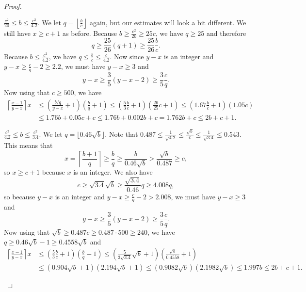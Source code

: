 \documentclass[10pt,a4paper]{amsart}
\begin{document}
\begin{proof}
\begin{case} $\frac{c^2}{20}\leq b\leq\frac{c^2}{4.2}$. We let $q=\left\lfloor\frac bc\right\rfloor$ again, but our estimates will look a bit different. We still have $x\geq c+1$ as before. Because $b\geq\frac{c^2}{20}\geq 25c$, we have $q\geq 25$ and therefore
\begin{equation*}
q\geq \frac {25}{26}(q+1)\geq\frac{25}{26}\frac bc.
\end{equation*}
Because $b\leq\frac{c^2}{4.2}$, we have $q\leq\frac bc\leq\frac c{4.2}$. Now since $y-x$ is an integer and $y-x\geq\frac cq-2\geq 2.2$, we must have $y-x\geq 3$ and
\begin{equation*}
y-x\geq\frac 35(y-x+2)\geq \frac 35\frac cq.
\end{equation*}
Now using that $c\geq 500$, we have
\begin{align*}
\left\lceil\frac{x-1}{y-x}\right\rceil x&\leq\left(\frac{b/q}{y-x}+1\right)\left(\frac bq+1\right)\leq\left(\frac 53\frac bc+1\right)\left(\frac{26}{25}c+1\right)\leq(1.67\frac bc+1)(1.05c)\\&\leq 1.76b+0.05c+c\leq 1.76b+0.002b+c=1.762b+c\leq 2b+c+1.
\end{align*}
\end{case}

\begin{case}$\frac{c^2}{4.2}\leq b\leq\frac{c^2}{3.4}$. We let $q=\lfloor 0.46\sqrt b\rfloor$. Note that $0.487\leq \frac 1{\sqrt{4.2}}\leq\frac{\sqrt b}c\leq\frac 1{\sqrt{3.4}}\leq 0.543$. This means that
\begin{equation*}
x=\left\lceil\frac{b+1}q\right\rceil\geq\frac bq\geq \frac b{0.46\sqrt b}>\frac{\sqrt b}{0.487}\geq c,
\end{equation*}
so $x\geq c+1$ because $x$ is an integer. We also have
\begin{equation*}
c\geq\sqrt{3.4}\sqrt b\geq\frac{\sqrt{3.4}}{0.46}q\geq 4.008q,
\end{equation*}
so because $y-x$ is an integer and $y-x\geq\frac cq-2>2.008$, we must have $y-x\geq 3$ and
\begin{equation*}
y-x\geq\frac 35(y-x+2)\geq\frac 35\frac cq.
\end{equation*}
Now using that $\sqrt b\geq 0.487c\geq 0.487\cdot 500\geq 240$, we have $q\geq 0.46\sqrt b-1\geq 0.4558\sqrt b$ and
\begin{align*}
\left\lceil\frac{x-1}{y-x}\right\rceil x&\leq\left(\frac53\frac bc+1\right)\left(\frac bq+1\right)\leq\left(\frac 5{3\sqrt{3.4}}\sqrt b+1\right)\left(\frac{\sqrt b}{0.4558}+1\right)\\&\leq(0.904\sqrt b+1)(2.194\sqrt b+1)\leq (0.9082\sqrt b)(2.1982\sqrt b)\leq 1.997b\leq 2b+c+1.
\end{align*}
\end{case}


\end{proof}
\end{document}
